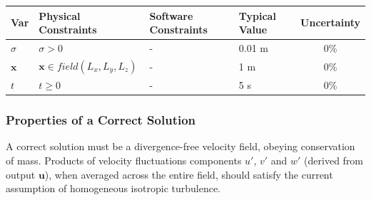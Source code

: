 \documentclass[12pt]{article}
\begin{document}

\begin{table}[!h]
  \caption{Input Variables} \label{TblInputVar}
  \renewcommand{\arraystretch}{1.2}
\noindent \begin{longtable*}{l l l l c} 
  \toprule
  \textbf{Var} & \textbf{Physical Constraints} & \textbf{Software Constraints} &
                             \textbf{Typical Value} & \textbf{Uncertainty}\\
  \midrule 
    $\sigma$ & $\sigma > 0$ & - & 0.01 \si[per-mode=symbol] {\metre} & 0\%
  \\
    $\textbf{x}$ & $\textbf{x} \in field(L_x,L_y,L_z)$ & - & 1 \si[per-mode=symbol] {\metre} & 0\%
  \\
    $t$ & $t \geq 0$ & - & 5 \si[per-mode=symbol] {\second} & 0\%
  \\
  \bottomrule
\end{longtable*}
\end{table}

\noindent 


\subsubsection{Properties of a Correct Solution} \label{sec_CorrectSolution}

\noindent
A correct solution must be a divergence-free velocity field, obeying conservation of mass. Products of velocity fluctuations components $u'$, $v'$ and $w'$ (derived from output $\textbf{u}$), when averaged across the entire field, should satisfy the current assumption of homogeneous isotropic turbulence.
\end{document}
